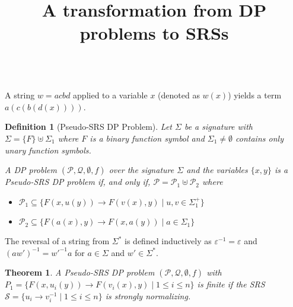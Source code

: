 \documentclass{article}
\title{A transformation from DP problems to SRSs}
\date{}
\newtheorem{definition}[figure]{Definition}
\newtheorem{theorem}[figure]{Theorem}
\renewcommand{\P}{\mathcal{P}}
\newcommand{\Q}{\mathcal{Q}}
\renewcommand{\S}{\mathcal{S}}
\begin{document}
\maketitle
\ \\[-10ex]
A string $w = acbd$ applied to a variable $x$ (denoted as $w(x)$) yields
a term $a(c(b(d(x))))$.
\begin{definition}[Pseudo-SRS DP Problem]
Let $\Sigma$ be a signature with $\Sigma = \{F\} \uplus \Sigma_{1}$
where $F$ is a binary function symbol and $\Sigma_{1} \neq \emptyset$ contains
only unary function symbols.

A DP problem $(\P,\Q,\emptyset,f)$ over the signature $\Sigma$ and the
variables $\{x,y\}$ is a \emph{Pseudo-SRS DP problem} if, and only if,
$\P = \P_{1} \uplus \P_{2}$ where
\begin{itemize}
\item $\P_{1} \subseteq \{ F(x, u(y)) \to F(v(x), y) \mid u,v \in \Sigma_{1}^{+} \}$
\item $\P_{2} \subseteq \{ F(a(x), y) \to F(x, a(y)) \mid a \in \Sigma_{1} \}$
\end{itemize}
\end{definition}
The reversal of a string from $\Sigma^{*}$ is defined inductively as $\varepsilon^{-1} = \varepsilon$
and $(aw')^{-1} = w'^{-1}a$ for $a \in \Sigma$ and $w' \in \Sigma^{*}$.
\begin{theorem}
A Pseudo-SRS DP problem $(\P,\Q,\emptyset,f)$ with $P_{1} = \{F(x, u_{i}(y)) \to F(v_{i}(x), y) \mid 1 \leq i \leq n\}$
is finite if the SRS $\S = \{u_{i} \to v_{i}^{-1} \mid 1 \leq i \leq n\}$ is strongly normalizing.
\end{theorem}
\end{document}
